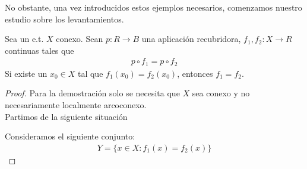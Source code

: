 No obstante, una vez introducidos estos ejemplos necesarios, comenzamos nuestro estudio sobre los levantamientos.

\begin{lema}\label{lema:unicidad_levantamiento}
    Sea un e.t. $X$ conexo. Sean $p:R \to B$ una aplicación recubridora, $f_1,f_2:X\to R$ continuas tales que 
    \begin{gather*}
        p\circ f_1 = p\circ f_2
    \end{gather*}
    Si existe un $x_0\in X$ tal que $f_1(x_0)=f_2(x_0)$, entonces $f_1=f_2$.

    \begin{proof}
        Para la demostración solo se necesita que $X$ sea conexo y no necesariamente localmente arcoconexo. \\

        Partimos de la siguiente situación
        \begin{center}
        \end{center}
        Consideramos el siguiente conjunto:
        \begin{gather*}
            Y=\{x\in X : f_1(x)=f_2(x)\}
        \end{gather*}


\end{proof}
\end{lema}
